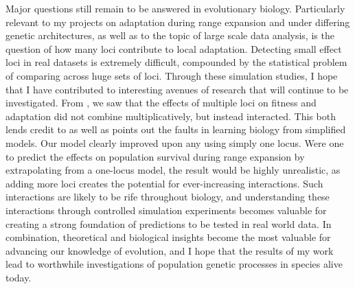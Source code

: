 Major questions still remain to be answered in evolutionary biology. Particularly relevant to my projects on adaptation during range expansion and under differing genetic architectures, as well as to the topic of large scale data analysis, is the question of how many loci contribute to local adaptation. Detecting small effect loci in real datasets is extremely difficult, compounded by the statistical problem of comparing across huge sets of loci. Through these simulation studies, I hope that I have contributed to interesting avenues of research that will continue to be investigated. From , we saw that the effects of multiple loci on fitness and adaptation did not combine multiplicatively, but instead interacted. This both lends credit to as well as points out the faults in learning biology from simplified models. Our model clearly improved upon any using simply one locus. Were one to predict the effects on population survival during range expansion by extrapolating from a one-locus model, the result would be highly unrealistic, as adding more loci creates the potential for ever-increasing interactions. Such interactions are likely to be rife throughout biology, and understanding these interactions through controlled simulation experiments becomes valuable for creating a strong foundation of predictions to be tested in real world data. In combination, theoretical and biological insights become the most valuable for advancing our knowledge of evolution, and I hope that the results of my work lead to worthwhile investigations of population genetic processes in species alive today.


